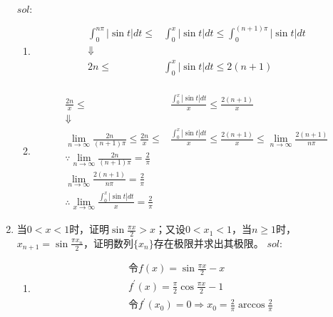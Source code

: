 \begin{enumerate}[{例}1.]
        $sol:$
        \begin{enumerate}[(1)]
            \item
                \begin{align*}
                    \int_0^{n\pi}\left|\sin t\right|dt\leq&\int_0^x\left|\sin t\right|dt\leq\int_0^{(n+1)\pi}\left|\sin t\right|dt\\
                    \Downarrow&\\
                    2n\leq&\int_0^x\left|\sin t\right|dt\leq 2(n+1)\\
                \end{align*}
            \item
                \begin{align*}
                    \frac{2n}{x}\leq&\frac{\int_0^x\left|\sin t\right|dt}{x}\leq \frac{2(n+1)}{x}\\
                    \Downarrow&\\
                    \lim_{n\to\infty}\frac{2n}{(n+1)\pi}\leq\frac{2n}{x}\leq&\frac{\int_0^x\left|\sin t\right|dt}{x}\leq \frac{2(n+1)}{x}\leq\lim_{n\to\infty}\frac{2(n+1)}{n\pi}\\
                    \because\lim_{n\to\infty}\frac{2n}{(n+1)\pi}=\frac{2}{\pi}\\
                    \lim_{n\to\infty}\frac{2(n+1)}{n\pi}=\frac{2}{\pi}\\
                    \therefore\lim_{x\to\infty}\frac{\int_0^x \left|\sin t \right|dt}{x}=\frac{2}{\pi}
                \end{align*}
        \end{enumerate}
    \item 当$0<x<1$时，证明$\sin \frac{\pi x}{2} > x$；又设$0<x_1<1$，当$n\geq 1$时，$x_{n+1}=\sin\frac{\pi x_n}{2}$，证明数列$\{x_n\}$存在极限并求出其极限。
        $sol:$
        \begin{enumerate}[(1)]
            \item
                \begin{align*}
                    &\mbox{令}f(x)=\sin\frac{\pi x}{2}-x\\
                    &f^{\prime}(x)=\frac{\pi}{2}\cos \frac{\pi x}{2}-1\\
                    &\mbox{令}f^{\prime}(x_0)=0\Rightarrow x_0=\frac{2}{\pi}\arccos \frac{2}{\pi}\\

\end{align*}
\end{enumerate}
\end{enumerate}
